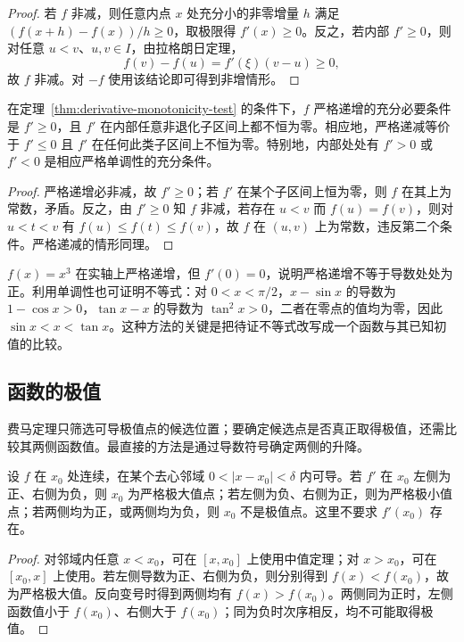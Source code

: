 \begin{proof}
若 $f$ 非减，则任意内点 $x$ 处充分小的非零增量 $h$ 满足 $(f(x+h)-f(x))/h\geq0$，取极限得 $f'(x)\geq0$。反之，若内部 $f'\geq0$，则对任意 $u<v$、$u,v\in I$，由拉格朗日定理，
\[
    f(v)-f(u)=f'(\xi)(v-u)\geq0,
\]
故 $f$ 非减。对 $-f$ 使用该结论即可得到非增情形。
\end{proof}

\begin{corollary}[严格单调的判据]
\label{cor:strict-monotonicity-test}
在定理~\ref{thm:derivative-monotonicity-test} 的条件下，$f$ 严格递增的充分必要条件是 $f'\geq0$，且 $f'$ 在内部任意非退化子区间上都不恒为零。相应地，严格递减等价于 $f'\leq0$ 且 $f'$ 在任何此类子区间上不恒为零。特别地，内部处处有 $f'>0$ 或 $f'<0$ 是相应严格单调性的充分条件。
\end{corollary}

\begin{proof}
严格递增必非减，故 $f'\geq0$；若 $f'$ 在某个子区间上恒为零，则 $f$ 在其上为常数，矛盾。反之，由 $f'\geq0$ 知 $f$ 非减，若存在 $u<v$ 而 $f(u)=f(v)$，则对 $u<t<v$ 有 $f(u)\leq f(t)\leq f(v)$，故 $f$ 在 $(u,v)$ 上为常数，违反第二个条件。严格递减的情形同理。
\end{proof}

$f(x)=x^3$ 在实轴上严格递增，但 $f'(0)=0$，说明严格递增不等于导数处处为正。利用单调性也可证明不等式：对 $0<x<\pi/2$，$x-\sin x$ 的导数为 $1-\cos x>0$，$\tan x-x$ 的导数为 $\tan^2x>0$，二者在零点的值均为零，因此 $\sin x<x<\tan x$。这种方法的关键是把待证不等式改写成一个函数与其已知初值的比较。

\subsection{函数的极值}
\label{subsec:extrema-of-functions}

费马定理只筛选可导极值点的候选位置；要确定候选点是否真正取得极值，还需比较其两侧函数值。最直接的方法是通过导数符号确定两侧的升降。

\begin{theorem}[极值的第一导数判别]
\label{thm:first-derivative-extremum-test}
设 $f$ 在 $x_0$ 处连续，在某个去心邻域 $0<|x-x_0|<\delta$ 内可导。若 $f'$ 在 $x_0$ 左侧为正、右侧为负，则 $x_0$ 为严格极大值点；若左侧为负、右侧为正，则为严格极小值点；若两侧均为正，或两侧均为负，则 $x_0$ 不是极值点。这里不要求 $f'(x_0)$ 存在。
\end{theorem}

\begin{proof}
对邻域内任意 $x<x_0$，可在 $[x,x_0]$ 上使用中值定理；对 $x>x_0$，可在 $[x_0,x]$ 上使用。若左侧导数为正、右侧为负，则分别得到 $f(x)<f(x_0)$，故为严格极大值。反向变号时得到两侧均有 $f(x)>f(x_0)$。两侧同为正时，左侧函数值小于 $f(x_0)$、右侧大于 $f(x_0)$；同为负时次序相反，均不可能取得极值。
\end{proof}

